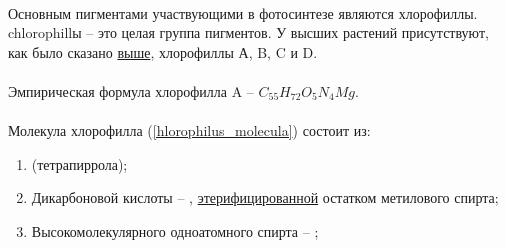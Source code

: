 \paragraph*{}Основным пигментами участвующими в фотосинтезе являются хлорофиллы. \hypertarget{sect_hlorophilus}{\gls{chlorophill}ы} -- это целая группа пигментов. У высших растений присутствуют, как было сказано \hyperlink{embryobionta}{выше}, хлорофиллы А, B, C и D. 

\paragraph*{}Эмпирическая формула хлорофилла A -- $C_{55}H_{72}O_{5}N_{4}Mg$.

\paragraph*{}Молекула хлорофилла (\ris \ref{hlorophilus_molecula}) состоит из: 

\begin{enumerate}

\item {} (тетрапиррола);
\item Дикарбоновой кислоты -- , \hyperlink{eterefication}{этерифицированной} остатком метилового спирта;
\item Высокомолекулярного одноатомного спирта -- ;

\end{enumerate}




